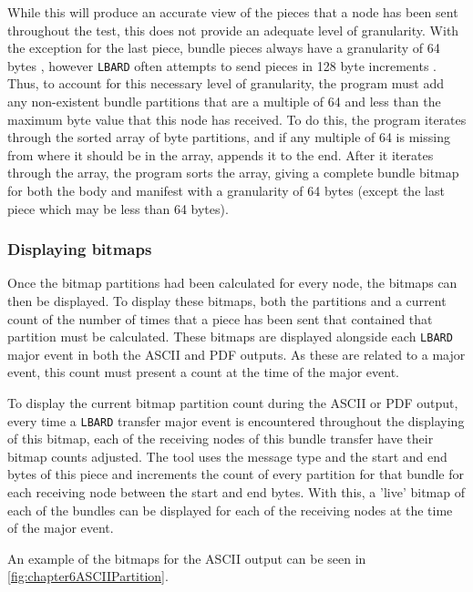 While this will produce an accurate view of the pieces that a node has been sent throughout the test, this does not provide an adequate level of granularity.
With the exception for the last piece, bundle pieces always have a granularity of 64 bytes \parencite{rhizomeDocumentation}, however \texttt{LBARD} often attempts to send pieces in 128 byte increments \parencite{rhizomeDocumentation}.
Thus, to account for this necessary level of granularity, the program must add any non-existent bundle partitions that are a multiple of 64 and less than the maximum byte value that this node has received.
To do this, the program iterates through the sorted array of byte partitions, and if any multiple of 64 is missing from where it should be in the array, appends it to the end.
After it iterates through the array, the program sorts the array, giving a complete bundle bitmap for both the body and manifest with a granularity of 64 bytes (except the last piece which may be less than 64 bytes).


\subsubsection{Displaying bitmaps}
Once the bitmap partitions had been calculated for every node, the bitmaps can then be displayed.
To display these bitmaps, both the partitions and a current count of the number of times that a piece has been sent that contained that partition must be calculated.
These bitmaps are displayed alongside each \texttt{LBARD} major event in both the ASCII and PDF outputs.
As these are related to a major event, this count must present a count at the time of the major event.

To display the current bitmap partition count during the ASCII or PDF output, every time a \texttt{LBARD} transfer major event is encountered throughout the displaying of this bitmap, each of the receiving nodes of this bundle transfer have their bitmap counts adjusted.
The tool uses the message type and the start and end bytes of this piece and increments the count of every partition for that bundle for each receiving node between the start and end bytes.
With this, a 'live' bitmap of each of the bundles can be displayed for each of the receiving nodes at the time of the major event.

An example of the bitmaps for the ASCII output can be seen in \figurename{ \ref{fig:chapter6ASCIIPartition}}.

